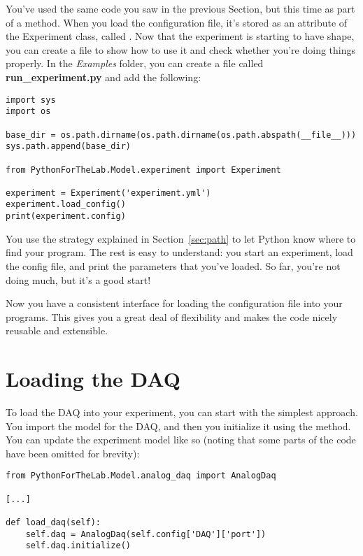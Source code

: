 You've used the same code you saw in the previous Section, but this time as part of a method. When you load the configuration file, it's stored as an attribute of the Experiment class, called . Now that the experiment is starting to have shape, you can create a file to show how to use it and check whether you're doing things properly. In the \emph{Examples} folder, you can create a file called \textbf{run\_experiment.py} and add the following:

\begin{verbatim}
import sys
import os

base_dir = os.path.dirname(os.path.dirname(os.path.abspath(__file__)))
sys.path.append(base_dir)

from PythonForTheLab.Model.experiment import Experiment

experiment = Experiment('experiment.yml')
experiment.load_config()
print(experiment.config)
\end{verbatim}

You use the strategy explained in Section~\ref{sec:path} to let Python know where to find your program. The rest is easy to understand: you start an experiment, load the config file, and print the parameters that you've loaded. So far, you're not doing much, but it's a good start!

Now you have a consistent interface for loading the configuration file into your programs. This gives you a great deal of flexibility and makes the code nicely reusable and extensible.


\section{Loading the DAQ}\label{sec:loading-daq}
To load the DAQ into your experiment, you can start with the simplest approach. You import the model for the DAQ, and then you initialize it using the  method. You can update the experiment model like so (noting that some parts of the code have been omitted for brevity):

\begin{verbatim}
from PythonForTheLab.Model.analog_daq import AnalogDaq

[...]

def load_daq(self):
    self.daq = AnalogDaq(self.config['DAQ']['port'])
    self.daq.initialize()
\end{verbatim}

